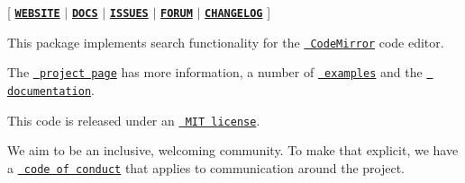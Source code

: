 \mbox{[} \href{https://codemirror.net/}{\texttt{ {\bfseries{W\+E\+B\+S\+I\+TE}}}} $\vert$ \href{https://codemirror.net/docs/ref/\#search}{\texttt{ {\bfseries{D\+O\+CS}}}} $\vert$ \href{https://github.com/codemirror/dev/issues}{\texttt{ {\bfseries{I\+S\+S\+U\+ES}}}} $\vert$ \href{https://discuss.codemirror.net/c/next/}{\texttt{ {\bfseries{F\+O\+R\+UM}}}} $\vert$ \href{https://github.com/codemirror/search/blob/main/CHANGELOG.md}{\texttt{ {\bfseries{C\+H\+A\+N\+G\+E\+L\+OG}}}} \mbox{]}

This package implements search functionality for the \href{https://codemirror.net/}{\texttt{ Code\+Mirror}} code editor.

The \href{https://codemirror.net/}{\texttt{ project page}} has more information, a number of \href{https://codemirror.net/examples/}{\texttt{ examples}} and the \href{https://codemirror.net/docs/}{\texttt{ documentation}}.

This code is released under an \href{https://github.com/codemirror/search/tree/main/LICENSE}{\texttt{ M\+IT license}}.

We aim to be an inclusive, welcoming community. To make that explicit, we have a \href{http://contributor-covenant.org/version/1/1/0/}{\texttt{ code of conduct}} that applies to communication around the project. 